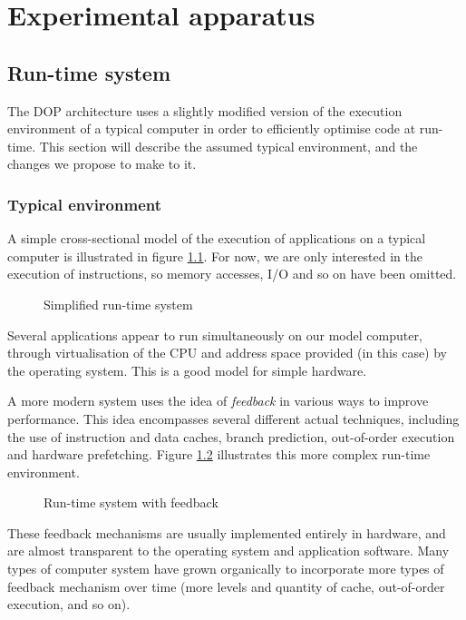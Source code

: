 \chapter{Experimental apparatus}

\section{Run-time system}

The DOP architecture uses a slightly modified version of the execution environment of a typical computer in order to efficiently optimise code at run-time. This section will describe the assumed typical environment, and the changes we propose to make to it.

\subsection{Typical environment}

A simple cross-sectional model of the execution of applications on a typical computer is illustrated in figure \ref{runtime1}. For now, we are only interested in the execution of instructions, so memory accesses, I/O and so on have been omitted.

\begin{figure}[tmb]
\centerline{}
\caption{\label{runtime1}Simplified run-time system}
\end{figure}

Several applications appear to run simultaneously on our model computer, through virtualisation of the CPU and address space provided (in this case) by the operating system. This is a good model for simple hardware.

A more modern system uses the idea of \emph{feedback} in various ways to improve performance. This idea encompasses several different actual techniques, including the use of instruction and data caches, branch prediction, out-of-order execution and hardware prefetching. Figure \ref{runtime2} illustrates this more complex run-time environment.

\begin{figure}[tmb]
\centerline{}
\caption{\label{runtime2}Run-time system with feedback}
\end{figure}

These feedback mechanisms are usually implemented entirely in hardware, and are almost transparent to the operating system and application software. Many types of computer system have grown organically to incorporate more types of feedback mechanism over time (more levels and quantity of cache, out-of-order execution, and so on).

